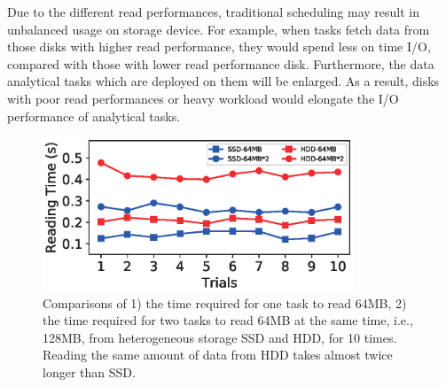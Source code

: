 \documentclass[conference]{IEEEtran}
\begin{document}
Due to the different read performances, traditional scheduling may result in unbalanced usage on storage device. For example, when tasks fetch data from those disks with higher read performance, they would spend less on time I/O, compared with those with lower read performance disk. Furthermore, the data analytical tasks which are deployed on them will be enlarged. As a result, disks with poor read performances or heavy workload would elongate the I/O performance of analytical tasks.

\begin{figure}[!t]
	\centering
	\includegraphics[height=1.8in]{fig_motivation5.eps}
	\caption{Comparisons of 1) the time required for one task to read 64MB, 2) the time required for two tasks to read 64MB at the same time, i.e., 128MB, from heterogeneous storage SSD and HDD, for 10 times. Reading the same amount of data from HDD takes almost twice longer than SSD.}
	\label{Fig:motivation}
\end{figure} 

 
\end{document}
